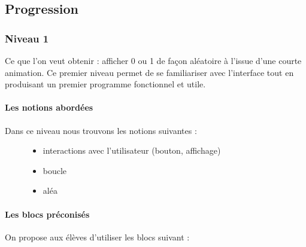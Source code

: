 \documentclass[letterpaper,10pt,french]{sphinxmanual}
\begin{document}
\subsection{Progression}
\label{\detokenize{decouverte/pileface-bloc:progression}}

\subsubsection{Niveau 1}
\label{\detokenize{decouverte/pileface-bloc1:niveau-1}}\label{\detokenize{decouverte/pileface-bloc1::doc}}
Ce que l’on veut obtenir : afficher 0 ou 1 de façon aléatoire à l’issue d’une courte animation.
Ce premier niveau permet de se familiariser avec l’interface tout en produisant un premier
programme fonctionnel et utile.


\paragraph{Les notions abordées}
\label{\detokenize{decouverte/pileface-bloc1:les-notions-abordees}}\begin{description}
\item[{Dans ce niveau nous trouvons les notions suivantes :}] \leavevmode\begin{itemize}
\item {} 
interactions avec l’utilisateur (bouton, affichage)

\item {} 
boucle

\item {} 
aléa

\end{itemize}

\end{description}



\paragraph{Les blocs préconisés}
\label{\detokenize{decouverte/pileface-bloc1:les-blocs-preconises}}
On propose aux élèves d’utiliser les blocs suivant :

\end{document}
